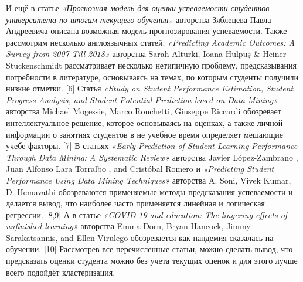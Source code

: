 \documentclass{article}
\begin{document}
И ещё в статье \textit{«Прогнозная модель для оценки успеваемости студентов университета по итогам текущего обучения»} авторства Зяблецева Павла Андреевича описана возможная модель прогнозирования успеваемости.
Также рассмотрим несколько англоязычных статей. \textit{«Predicting Academic Outcomes: A Survey from 2007 Till 2018»} авторства Sarah Alturki, Ioana Hulpuș & Heiner Stuckenschmidt рассматривает несколько нетипичную проблему, предсказывания потребности в литературе, основываясь на темах, по которым студенты получили низкие отметки. [6] Статья \textit{«Study on Student Performance Estimation, Student Progress Analysis, and Student Potential Prediction based on Data Mining»} авторства Michael Mogessie, Marco Ronchetti, Giuseppe Riccardi обозревает интеллектуальное решение, которое основываясь на оценках, а также личной информации о занятиях студентов в не учебное время определяет мешающие учебе факторы. [7] В статьях \textit{«Early Prediction of Student Learning Performance Through Data Mining: A Systematic Review»} авторства Javier López-Zambrano , Juan Alfonso Lara Torralbo , and Cristóbal Romero и \textit{«Predicting Student Performance Using Data Mining Techniques»} авторства A. Soni, Vivek Kumar, D. Hemavathi обозреваются применяемые методы предсказания успеваемости и делается вывод, что наиболее часто применяется линейная и логическая регрессии. [8,9] А в статье \textit{«COVID-19 and education: The lingering effects of unfinished learning»} авторства Emma Dorn, Bryan Hancock, Jimmy Sarakatsannis, and Ellen Virulego обозревается как пандемия сказалась на обучении. [10]
Рассмотрев все перечисленные статьи, можно сделать вывод, что предсказать оценки студента можно без учета текущих оценок и для этого лучше всего подойдёт кластеризация.
\end{document}
